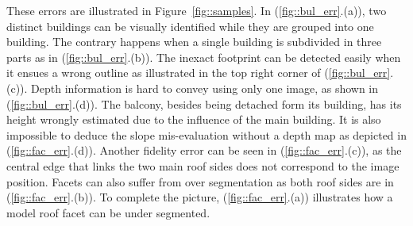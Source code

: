 \documentclass[runningheads]{llncs}
\begin{document}
These errors are illustrated in Figure~\ref{fig::samples}. In (\ref{fig::bul_err}.(a)), two distinct buildings can be visually identified  while they are grouped into one building. The contrary happens when a single building is subdivided in three parts as in (\ref{fig::bul_err}.(b)). The inexact footprint can be detected easily when it ensues a wrong outline as illustrated in the top right corner of (\ref{fig::bul_err}.(c)). Depth information is hard to convey using only one image, as shown in (\ref{fig::bul_err}.(d)). The balcony, besides being detached form its building, has its height wrongly estimated due to the influence of the main building. It is also impossible to deduce the slope mis-evaluation without a depth map as depicted in (\ref{fig::fac_err}.(d)). Another fidelity error can be seen in (\ref{fig::fac_err}.(c)), as the central edge that links the two main roof sides does not correspond to the image position. Facets can also suffer from over segmentation as both roof sides are in (\ref{fig::fac_err}.(b)). To complete the picture, (\ref{fig::fac_err}.(a)) illustrates how a model roof facet can be under segmented.
\end{document}
